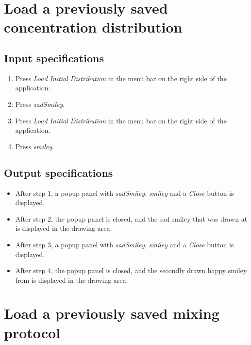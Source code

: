 \section{Load a previously saved concentration distribution}

\subsection*{Input specifications}
\begin{enumerate}
\item Press \emph{Load Initial Distribution} in the menu bar on the right side of the application.
\item Press \emph{sadSmiley}.
\item Press \emph{Load Initial Distribution} in the menu bar on the right side of the application.
\item Press \emph{smiley}.
\end{enumerate}

\subsection*{Output specifications}
\begin{itemize}
\item After step 1, a popup panel with \emph{sadSmiley}, \emph{smiley} and a \emph{Close} button is displayed.
\item After step 2, the popup panel is closed, and the sad smiley that was drawn at  is displayed in the drawing area.
\item After step 3, a popup panel with \emph{sadSmiley}, \emph{smiley} and a \emph{Close} button is displayed.
\item After step 4, the popup panel is closed, and the secondly drawn happy smiley from  is displayed in the drawing area.
\end{itemize}

\section{Load a previously saved mixing protocol}

